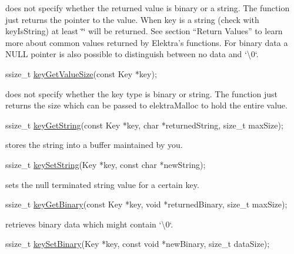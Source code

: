 does not specify whether the returned value is binary or a string. The function just returns the pointer to the value. When {\ttfamily key} is a string (check with {\ttfamily key\+Is\+String}) at least {\ttfamily \char`\"{}\char`\"{}} will be returned. See section “\+Return Values” to learn more about common values returned by Elektra’s functions. For binary data a {\ttfamily N\+U\+LL} pointer is also possible to distinguish between no data and `\textquotesingle{}\textbackslash{}0\textquotesingle{}`.


\begin{DoxyCode}
ssize\_t \hyperlink{group__keyvalue_gae326672fffb7474abfe9baf53b73217e}{keyGetValueSize}(\textcolor{keyword}{const} Key *key);
\end{DoxyCode}


does not specify whether the key type is binary or string. The function just returns the size which can be passed to {\ttfamily elektra\+Malloc} to hold the entire value.


\begin{DoxyCode}
ssize\_t \hyperlink{group__keyvalue_ga41b9fac5ccddafe407fc0ae1e2eb8778}{keyGetString}(\textcolor{keyword}{const} Key *key, \textcolor{keywordtype}{char} *returnedString, \textcolor{keywordtype}{size\_t} maxSize);
\end{DoxyCode}


stores the string into a buffer maintained by you.


\begin{DoxyCode}
ssize\_t \hyperlink{group__keyvalue_ga622bde1eb0e0c4994728331326340ef2}{keySetString}(Key *key, \textcolor{keyword}{const} \textcolor{keywordtype}{char} *newString);
\end{DoxyCode}


sets the null terminated string value for a certain key.


\begin{DoxyCode}
ssize\_t \hyperlink{group__keyvalue_ga4c0d8a4a11174197699c231e0b5c3c84}{keyGetBinary}(\textcolor{keyword}{const} Key *key, \textcolor{keywordtype}{void} *returnedBinary, \textcolor{keywordtype}{size\_t} maxSize);
\end{DoxyCode}


retrieves binary data which might contain `\textquotesingle{}\textbackslash{}0\textquotesingle{}`.


\begin{DoxyCode}
ssize\_t \hyperlink{group__keyvalue_gaa50a5358fd328d373a45f395fa1b99e7}{keySetBinary}(Key *key, \textcolor{keyword}{const} \textcolor{keywordtype}{void} *newBinary, \textcolor{keywordtype}{size\_t} dataSize);
\end{DoxyCode}


